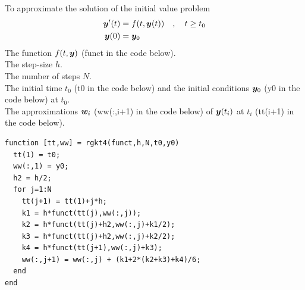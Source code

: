 \begin{code}
To approximate the solution of the initial value problem
\[
\begin{split}
\bm{y}'(t) &= f(t,\bm{y}(t)) \quad , \quad t \geq t_0 \\
\bm{y}(0) &= \bm{y}_0
\end{split}
\]
 The function $f(t,\bm{y})$ (funct in the code below). \\
The step-size $h$.\\
The number of steps $N$.\\
The initial time $t_0$ (t0 in the code below) and the initial
conditions $\bm{y}_0$ (y0 in the code below) at $t_0$.\\
 The approximations $\bm{w}_i$ (ww(:,i+1) in the code below)
of $\bm{y}(t_i)$ at $t_i$ (tt(i+1) in the code below).
\small
\begin{verbatim}
function [tt,ww] = rgkt4(funct,h,N,t0,y0)
  tt(1) = t0;
  ww(:,1) = y0;
  h2 = h/2;
  for j=1:N
    tt(j+1) = tt(1)+j*h;
    k1 = h*funct(tt(j),ww(:,j));
    k2 = h*funct(tt(j)+h2,ww(:,j)+k1/2);
    k3 = h*funct(tt(j)+h2,ww(:,j)+k2/2);
    k4 = h*funct(tt(j+1),ww(:,j)+k3);
    ww(:,j+1) = ww(:,j) + (k1+2*(k2+k3)+k4)/6;
  end
end
\end{verbatim}
\end{code}

